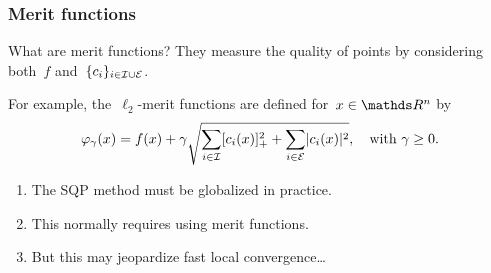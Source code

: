 \documentclass{polyu-presentation}
\newcommand{\con}[1]{c_{#1}}
\newcommand{\ieq}{\mathcal{E}}
\newcommand{\iub}{\mathcal{I}}
\newcommand{\obj}{f}
\begin{document}
\begin{frame}
    \frametitle{Merit functions}

	\begin{block}{What are merit functions?}
        They measure the \alert{quality} of points by considering both~$\obj$ and~$\set{\con{i}}_{i \in \iub \cup \ieq}$.
    \end{block}

    \medskip

    For example, the~\alert{$\ell_2$-merit functions} are defined for~$x \in \R^n$ by
    \begin{equation*}
        \varphi_{\gamma}(x) = \obj(x) + \gamma \sqrt{\sum_{i \in \iub} \posp{\con{i}(x)}^2 + \sum_{i \in \ieq} \abs{\con{i}(x)}^2}, \quad \text{with~$\gamma \ge 0$}.
    \end{equation*}

    \begin{block}{}
        \begin{enumerate}[<+(1)->]
            \item The SQP method must be \alert{globalized} in practice.
            \item This normally requires using \alert{merit functions}.
            \item But this may \alert{jeopardize} fast local convergence\dots
        \end{enumerate}
    \end{block}
\end{frame}
\end{document}

